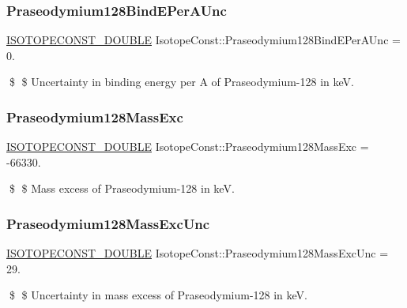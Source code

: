 \subsubsection{\texorpdfstring{Praseodymium128\+Bind\+E\+Per\+A\+Unc}{Praseodymium128BindEPerAUnc}}
{\footnotesize\ttfamily \mbox{\hyperlink{group___isotope_const-_macros_ga8f45a7272ce02c0b4c65c44636ed719a}{I\+S\+O\+T\+O\+P\+E\+C\+O\+N\+S\+T\+\_\+\+D\+O\+U\+B\+LE}} Isotope\+Const\+::\+Praseodymium128\+Bind\+E\+Per\+A\+Unc = 0.}

\$ \$ Uncertainty in binding energy per A of Praseodymium-\/128 in keV. \mbox{\label{group___isotope_const-_praseodymium-_pr128_ga564ef69c864efb8739d88ddb2e961909}} 
\subsubsection{\texorpdfstring{Praseodymium128\+Mass\+Exc}{Praseodymium128MassExc}}
{\footnotesize\ttfamily \mbox{\hyperlink{group___isotope_const-_macros_ga8f45a7272ce02c0b4c65c44636ed719a}{I\+S\+O\+T\+O\+P\+E\+C\+O\+N\+S\+T\+\_\+\+D\+O\+U\+B\+LE}} Isotope\+Const\+::\+Praseodymium128\+Mass\+Exc = -\/66330.}

\$ \$ Mass excess of Praseodymium-\/128 in keV. \mbox{\label{group___isotope_const-_praseodymium-_pr128_gad82f1b24733b4bbc0d20548b72f6630c}} 
\subsubsection{\texorpdfstring{Praseodymium128\+Mass\+Exc\+Unc}{Praseodymium128MassExcUnc}}
{\footnotesize\ttfamily \mbox{\hyperlink{group___isotope_const-_macros_ga8f45a7272ce02c0b4c65c44636ed719a}{I\+S\+O\+T\+O\+P\+E\+C\+O\+N\+S\+T\+\_\+\+D\+O\+U\+B\+LE}} Isotope\+Const\+::\+Praseodymium128\+Mass\+Exc\+Unc = 29.}

\$ \$ Uncertainty in mass excess of Praseodymium-\/128 in keV. \mbox{\label{group___isotope_const-_praseodymium-_pr128_gafa976aadf3f6022f210246a8a89b4ee7}} 

